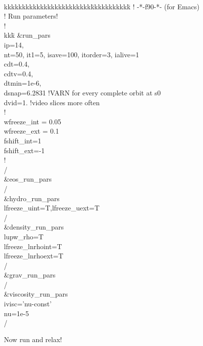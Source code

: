 \documentclass[a4paper,10pt]{article}
\newcommand{\pderiv}[2]{\frac{\partial #1}{\partial #2}}
\renewcommand{\v}[1]{{\boldsymbol #1}} %
\newcommand{\del}{\v{\nabla}}
\newcommand{\grad}{\del}
\begin{document}
{\tt 
\begin{tabbing}
kkkkkkkkkkkkkkkkkkkkkkkk\=kkkkkkkkkkk\=\kill
! \>                          -*-f90-*-\>     (for Emacs)\\
!  Run parameters!\\
!\\
kkk\=\kill 
\&run\_pars\\
  \>ip=14,\\
  \>nt=50, it1=5, isave=100, itorder=3, ialive=1\\
  \>cdt=0.4,\\ 
  \>cdtv=0.4, \\
  \>dtmin=1e-6,\\
  \>dsnap=6.2831   !VARN for every complete orbit at s0\\
  \>dvid=1.        !video slices more often\\
!\\
  \>wfreeze\_int = 0.05\\
  \>wfreeze\_ext = 0.1\\
  \>fshift\_int=1\\
  \>fshift\_ext=-1\\
!\\
/\\
\&eos\_run\_pars\\
/\\
\&hydro\_run\_pars\\
  \>lfreeze\_uint=T,lfreeze\_uext=T\\
/\\
\&density\_run\_pars\\
  \>lupw\_rho=T\\
  \>lfreeze\_lnrhoint=T\\
  \>lfreeze\_lnrhoext=T\\
/\\
\&grav\_run\_pars\\
/\\
\&viscosity\_run\_pars\\
  \>ivisc='nu-const'\\
  \>nu=1e-5\\
/
\end{tabbing}
}

Now run and relax!


%
%
%
\end{document}
